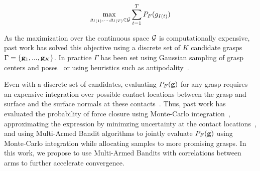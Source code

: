 \vspace{-2ex}
\begin{align}
	\underset{g_{I(1)}, ..., g_{I(T)} \in \mathcal{G}}{\text{max }} \sum \limits_{t=1}^T P_F(g_{I(t)}) \label{eq:objective}
\end{align}

\noindent As the maximization over the continuous space $\mathcal{G}$ is computationally expensive, past work has solved this objective using a discrete set of $K$ candidate grasps $\Gamma = \left\{ \mathbf{g}_1, ..., \mathbf{g}_K \right\}$.
In practice $\Gamma$ has been set using Gaussian sampling of grasp centers and poses~\cite{laskey2015bandits} or using heuristics such as antipodality~\cite{mahler2015opt}.

Even with a discrete set of candidates, evaluating $P_F(\mathbf{g})$ for any grasp requires an expensive integration over possible contact locations between the grasp and surface and the surface normals at these contacts~\cite{mahler2015gp}.
Thus, past work has evaluated the probability of force closure using Monte-Carlo integration~\cite{kehoe2012estimating, kehoe2012toward, weisz2012pose}, approximating the expression by minimzing uncertainty at the contact locations~\cite{mahler2015gp}, and using Multi-Armed Bandit algorithms to jointly evaluate $P_F(\mathbf{g})$ using Monte-Carlo integration while allocating samples to more promising grasps.
In this work, we propose to use Multi-Armed Bandits with correlations between arms to further accelerate convergence.

